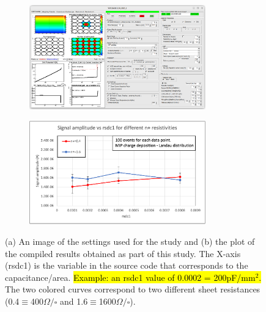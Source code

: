\documentclass[11pt]{article}
\newcommand{\hlyellow}[1]{{\sethlcolor{yellow}\hl{#1}}}
\begin{document}
\begin{figure}[h!]
    \centering
    \begin{subfigure}[t]{0.49\textwidth}
        \centering
        \includegraphics[width=3in]{Images/recreate_kita_amp_vs_ccp_other_settings.png}
        \caption{}
        \label{fig:recreate_kita_amp_vs_ccp_other_settings}
    \end{subfigure}%
    \begin{subfigure}[t]{0.49\textwidth}
        \centering
        \includegraphics[width=3in]{Images/recreate_kita_amp_vs_ccp_plot.png}
        \caption{}
        \label{fig:recreate_kita_amp_vs_ccp_plot}
    \end{subfigure}
    \caption{(a) An image of the settings used for the study and (b) the plot of the compiled results obtained as part of this study. The X-axis (rsdc1) is the variable in the source code that corresponds to the capacitance/area. \hlyellow{Example: an rsdc1 value of 0.0002 = 200pF/mm$^2$.} The two colored curves correspond to two different sheet resistances (0.4$\equiv$400$\Omega/\square$ and 1.6$\equiv$1600$\Omega/\square$).}
    \label{fig:recreate_kita_amp_vs_ccp}
\end{figure}



\end{document}
